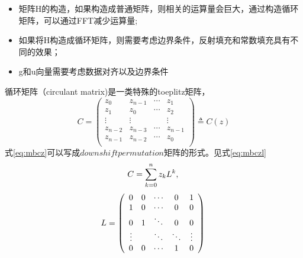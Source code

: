 \documentclass[UTF8]{ctexart}
\begin{document}
\begin{sloppypar}
        \begin{itemize}
            \item 矩阵H的构造，如果构造成普通矩阵，则相关的运算量会巨大，通过构造循环矩阵，可以通过FFT减少运算量;
            \item 如果将H构造成循环矩阵，则需要考虑边界条件，反射填充和常数填充具有不同的效果；
            \item g和u向量需要考虑数据对齐以及边界条件
        \end{itemize}
        循环矩阵（circulant matrix)是一类特殊的toeplitz矩阵，
        \begin{equation}
            C = \begin{pmatrix} z_0    &    z_{n-1}    &    \cdots    & z_1 \\
                    z_1    &    z_0        &    \cdots    & z_2 \\
                    \vdots &    \vdots     &              & \vdots \\
                    z_{n-2}&    z_{n-3}    &    \cdots    & z_{n-1} \\
                    z_{n-1}&    z_{n-2}    &    \cdots    & z_{0} \\
            \end{pmatrix} \triangleq C(z)
            \label{eq:mbcz}
        \end{equation}
        式\eqref{eq:mbcz}可以写成$downshift permutation$矩阵的形式。见式\eqref{eq:mbczl}
        \begin{equation}
            C = \sum\limits_{k=0}^n z_k L^k,\\
            \label{eq:mbczl}
        \end{equation}
        \begin{equation}
            L =
            \left(
            \begin{array}{ccccccccc}
                0      & 0      & \cdots & 0      &       1 \\
                1      & 0      & \cdots & 0      &       0 \\
                0      & 1      & \ddots & 0      &       0 \\
                \vdots &        & \ddots & \ddots &       \vdots\\
                0      & 0      & \cdots & 1      &       0\\
            \end{array}
            \right)\\
            \label{eq:mbl}
        \end{equation}

\end{sloppypar}
\end{document}

